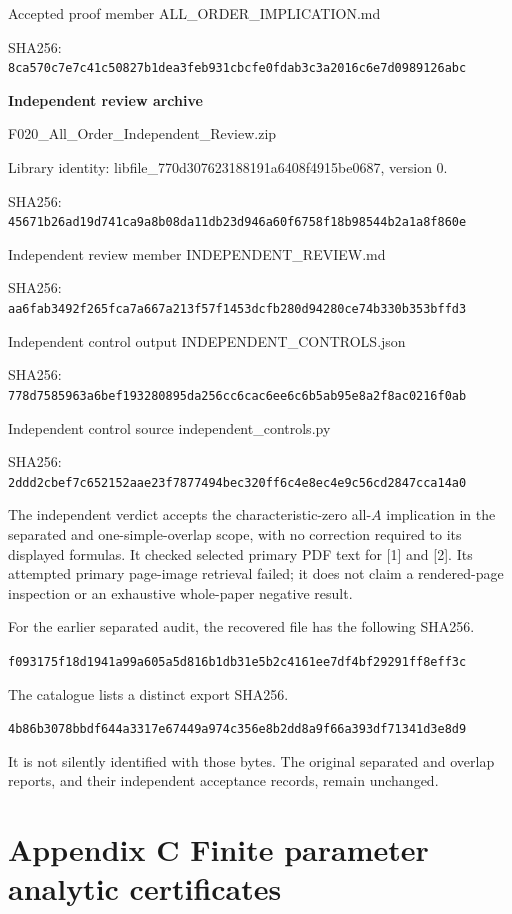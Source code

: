 \documentclass[
  11pt,
]{article}
\begin{document}
Accepted proof member ALL\_ORDER\_IMPLICATION.md

SHA256:
\texttt{8ca570c7e7c41c50827b1dea3feb931cbcfe0fdab3c3a2016c6e7d0989126abc}

\textbf{Independent review archive}

F020\_All\_Order\_Independent\_Review.zip

Library identity: libfile\_770d307623188191a6408f4915be0687, version 0.

SHA256:
\texttt{45671b26ad19d741ca9a8b08da11db23d946a60f6758f18b98544b2a1a8f860e}

Independent review member INDEPENDENT\_REVIEW.md

SHA256:
\texttt{aa6fab3492f265fca7a667a213f57f1453dcfb280d94280ce74b330b353bffd3}

Independent control output INDEPENDENT\_CONTROLS.json

SHA256:
\texttt{778d7585963a6bef193280895da256cc6cac6ee6c6b5ab95e8a2f8ac0216f0ab}

Independent control source independent\_controls.py

SHA256:
\texttt{2ddd2cbef7c652152aae23f7877494bec320ff6c4e8ec4e9c56cd2847cca14a0}

The independent verdict accepts the characteristic-zero all-\(A\)
implication in the separated and one-simple-overlap scope, with no
correction required to its displayed formulas. It checked selected
primary PDF text for {[}1{]} and {[}2{]}. Its attempted primary
page-image retrieval failed; it does not claim a rendered-page
inspection or an exhaustive whole-paper negative result.

For the earlier separated audit, the recovered file has the following
SHA256.

\texttt{f093175f18d1941a99a605a5d816b1db31e5b2c4161ee7df4bf29291ff8eff3c}

The catalogue lists a distinct export SHA256.

\texttt{4b86b3078bbdf644a3317e67449a974c356e8b2dd8a9f66a393df71341d3e8d9}

It is not silently identified with those bytes. The original separated
and overlap reports, and their independent acceptance records, remain
unchanged.

\clearpage
\section{Appendix C Finite parameter analytic certificates}
\label{appendix-c-finite-certificates}
\end{document}
